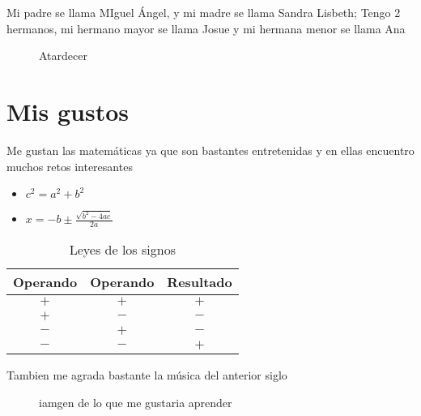 Mi padre se llama MIguel Ángel, y mi madre se llama Sandra Lisbeth; Tengo 2 hermanos, mi hermano mayor se llama Josue y mi hermana menor se llama Ana

\begin{figure}[h]
  \centerimg
  \caption{Atardecer}
  \label{fig:atardecer}
\end{figure}


\newpage

\maketitle
\tableofcontents
\maketitle
{}

\chapter*{Mis gustos}

Me gustan las matemáticas ya que son bastantes entretenidas y en ellas encuentro muchos retos interesantes
\begin{itemize}
\item $c^2 = a^2 + b^2$
\item $x=-b \pm \frac{\sqrt{b^2-4ac}}{2a}$
\end{itemize}


\begin{table}[h]
  \centering
  \begin{tabular}{| c  c  c  |}
    \hline
    Operando & Operando & Resultado\\\hline
    $+$ & $+$ & $+$\\\hline
    $+$ & $-$ & $-$\\\hline
    $-$ & $+$ & $-$\\\hline
    $-$ & $-$ & $+$\\\hline    
  \end{tabular}
  \caption{Leyes de los signos}
  \label{tabla:leyes_signos}
\end{table}

Tambien me agrada bastante la música del anterior siglo
\begin{figure}[h]
  \centerimg
  \caption{iamgen de lo que me gustaria aprender}
  \label{fig:guitarra}
\end{figure}

